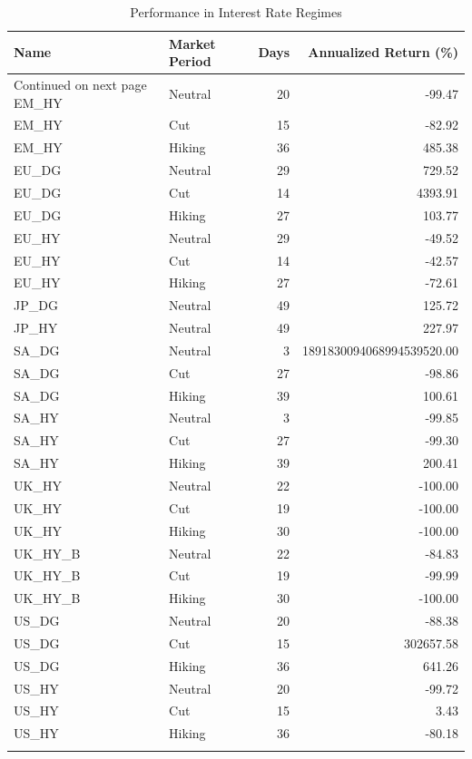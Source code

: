 \documentclass[12pt,preprint, authoryear]{elsarticle}
\numberwithin{equation}{section}
\numberwithin{figure}{section}
\numberwithin{table}{section}
\begin{document}
\begingroup\fontsize{12pt}{13pt}\selectfont
\begin{longtable}{llrr}
  \toprule
Name & Market Period & Days & Annualized Return (\%) \\ 
  \hline 
\endhead 
\hline 
{\footnotesize Continued on next page} 
\endfoot 
\endlastfoot 
 \midrule
EM\_HY & Neutral &  20 & -99.47 \\ 
  EM\_HY & Cut &  15 & -82.92 \\ 
  EM\_HY & Hiking &  36 & 485.38 \\ 
  EU\_DG & Neutral &  29 & 729.52 \\ 
  EU\_DG & Cut &  14 & 4393.91 \\ 
  EU\_DG & Hiking &  27 & 103.77 \\ 
  EU\_HY & Neutral &  29 & -49.52 \\ 
  EU\_HY & Cut &  14 & -42.57 \\ 
  EU\_HY & Hiking &  27 & -72.61 \\ 
  JP\_DG & Neutral &  49 & 125.72 \\ 
  JP\_HY & Neutral &  49 & 227.97 \\ 
  SA\_DG & Neutral &   3 & 1891830094068994539520.00 \\ 
  SA\_DG & Cut &  27 & -98.86 \\ 
  SA\_DG & Hiking &  39 & 100.61 \\ 
  SA\_HY & Neutral &   3 & -99.85 \\ 
  SA\_HY & Cut &  27 & -99.30 \\ 
  SA\_HY & Hiking &  39 & 200.41 \\ 
  UK\_HY & Neutral &  22 & -100.00 \\ 
  UK\_HY & Cut &  19 & -100.00 \\ 
  UK\_HY & Hiking &  30 & -100.00 \\ 
  UK\_HY\_B & Neutral &  22 & -84.83 \\ 
  UK\_HY\_B & Cut &  19 & -99.99 \\ 
  UK\_HY\_B & Hiking &  30 & -100.00 \\ 
  US\_DG & Neutral &  20 & -88.38 \\ 
  US\_DG & Cut &  15 & 302657.58 \\ 
  US\_DG & Hiking &  36 & 641.26 \\ 
  US\_HY & Neutral &  20 & -99.72 \\ 
  US\_HY & Cut &  15 & 3.43 \\ 
  US\_HY & Hiking &  36 & -80.18 \\ 
   \bottomrule
\caption{Performance in Interest Rate Regimes\label{tab3}} 
\end{longtable}
\endgroup
\end{document}
